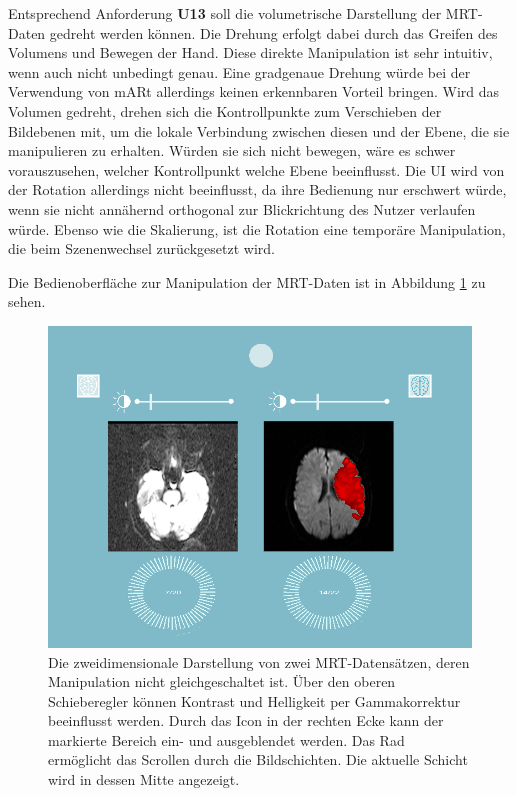 Entsprechend Anforderung \textbf{U13} soll die volumetrische Darstellung der MRT-Daten gedreht werden können. 
Die Drehung erfolgt dabei durch das Greifen des Volumens und Bewegen der Hand. Diese direkte Manipulation ist sehr intuitiv, wenn auch nicht unbedingt genau. Eine gradgenaue Drehung würde bei der Verwendung von mARt allerdings keinen erkennbaren Vorteil bringen. 
Wird das Volumen gedreht, drehen sich die Kontrollpunkte zum Verschieben der Bildebenen mit, um die lokale Verbindung zwischen diesen und der Ebene, die sie manipulieren zu erhalten. Würden sie sich nicht bewegen, wäre es schwer vorauszusehen, welcher Kontrollpunkt welche Ebene beeinflusst. 
Die UI wird von der Rotation allerdings nicht beeinflusst, da ihre Bedienung nur erschwert würde, wenn sie nicht annähernd orthogonal zur Blickrichtung des Nutzer verlaufen würde. 
Ebenso wie die Skalierung, ist die Rotation eine temporäre Manipulation, die beim Szenenwechsel zurückgesetzt wird.


Die Bedienoberfläche zur Manipulation der MRT-Daten ist in Abbildung \ref{img:mARt2d} zu sehen.

\begin{figure}[!htb]
	\centering
	\includegraphics[width=0.7\linewidth]{images/mARt2d_2.png}
	\caption{Die zweidimensionale Darstellung von zwei MRT-Datensätzen, deren Manipulation nicht gleichgeschaltet ist. Über den oberen Schieberegler können Kontrast und Helligkeit per Gammakorrektur beeinflusst werden. Durch das Icon in der rechten Ecke kann der markierte Bereich ein- und ausgeblendet werden. Das Rad ermöglicht das Scrollen durch die Bildschichten. Die aktuelle Schicht wird in dessen Mitte angezeigt. }
	\label{img:mARt2d}
\end{figure}
\FloatBarrier

